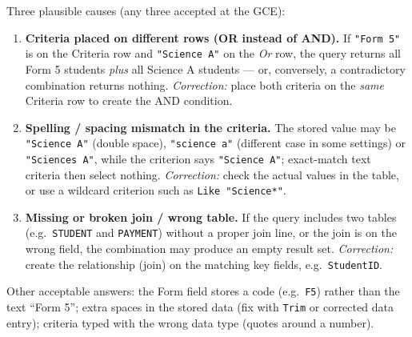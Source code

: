 \documentclass[11pt]{article}
\begin{document}
\begin{corrige}
Three plausible causes (any three accepted at the GCE):
\begin{enumerate}
\item \textbf{Criteria placed on different rows (OR instead of AND).} If \texttt{"Form 5"} is on the Criteria row and \texttt{"Science A"} on the \emph{Or} row, the query returns all Form 5 students \emph{plus} all Science A students --- or, conversely, a contradictory combination returns nothing. \emph{Correction:} place both criteria on the \emph{same} Criteria row to create the AND condition.
\item \textbf{Spelling / spacing mismatch in the criteria.} The stored value may be \texttt{"Science  A"} (double space), \texttt{"science a"} (different case in some settings) or \texttt{"Sciences A"}, while the criterion says \texttt{"Science A"}; exact-match text criteria then select nothing. \emph{Correction:} check the actual values in the table, or use a wildcard criterion such as \texttt{Like "Science*"}.
\item \textbf{Missing or broken join / wrong table.} If the query includes two tables (e.g.\ \texttt{STUDENT} and \texttt{PAYMENT}) without a proper join line, or the join is on the wrong field, the combination may produce an empty result set. \emph{Correction:} create the relationship (join) on the matching key fields, e.g.\ \texttt{StudentID}.
\end{enumerate}
Other acceptable answers: the Form field stores a code (e.g.\ \texttt{F5}) rather than the text ``Form 5''; extra spaces in the stored data (fix with \texttt{Trim} or corrected data entry); criteria typed with the wrong data type (quotes around a number).
\end{corrige}
\end{document}

